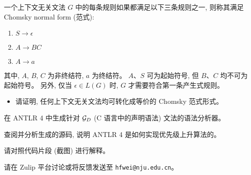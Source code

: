 \documentclass[a4paper, justified]{tufte-handout}
\begin{document}
\begin{solution}
\end{solution}

\beginoptional

\begin{problem}
  一个上下文无关文法 $G$ 中的每条规则如果都满足以下三条规则之一,
  则称其满足 Chomsky normal form (范式):
  \begin{enumerate}[(1)]
    \item $S \to \epsilon$
    \item $A \to BC$
    \item $A \to a$
  \end{enumerate}
  其中, $A$, $B$, $C$ 为非终结符, $a$ 为终结符。
  $A$、$S$ 可为起始符号, 但 $B$、$C$ 均不可为起始符号。
  另外, 仅当 $\epsilon \in L(G)$ 时, $G$ 才需要符合第一条产生式规则。
  \begin{itemize}
    \item 请证明, 任何上下文无关文法均可转化成等价的 Chomsky 范式形式。
  \end{itemize}
\end{problem}

\begin{solution}
\end{solution}

\pagebreak
\begin{problem}
  在 ANTLR 4 中生成针对 $\mathcal{G}_{D}$ (C 语言中的声明语法)
  文法的语法分析器。

  \noindent 查阅并分析生成的源码, 说明 ANTLR 4 是如何实现优先级上升算法的。

  \noindent 请对照代码片段 (截图) 进行解释。
\end{problem}

\begin{solution}
\end{solution}



\beginfb

请在 Zulip 平台讨论或将反馈发送至 \texttt{hfwei@nju.edu.cn}。
\end{document}
